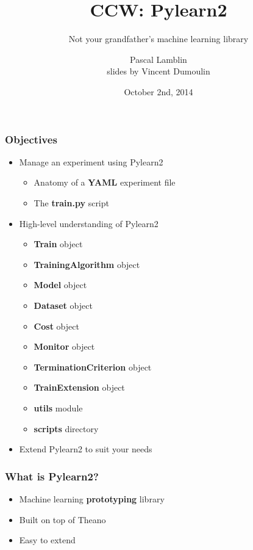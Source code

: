 \documentclass[mathserif, xcolor=dvipsnames]{beamer}
\title{CCW: Pylearn2}
\subtitle{Not your grandfather's machine learning library}
\author{Pascal Lamblin\\
slides by Vincent Dumoulin}
\date{October 2nd, 2014}
\begin{document}
\begin{frame}[plain]
    \titlepage
\end{frame}

\begin{frame}
    \frametitle{Objectives}
    \begin{itemize}\addtolength{\itemsep}{0.5\baselineskip}
        \item{
            {\Large Manage an experiment using Pylearn2}
            \begin{itemize}
                \item{Anatomy of a \textbf{YAML} experiment file}
                \item{The \textbf{train.py} script}
            \end{itemize}
        }
        \item{
            {\Large High-level understanding of Pylearn2}
            \begin{itemize}
                \item{\textbf{Train} object}
                \item{\textbf{TrainingAlgorithm} object}
                \item{\textbf{Model} object}
                \item{\textbf{Dataset} object}
                \item{\textbf{Cost} object}
                \item{\textbf{Monitor} object}
                \item{\textbf{TerminationCriterion} object}
                \item{\textbf{TrainExtension} object}
                \item{\textbf{utils} module}
                \item{\textbf{scripts} directory}
            \end{itemize}
        }
        \item{
            {\Large Extend Pylearn2 to suit your needs}
        }
    \end{itemize}
\end{frame}

\begin{frame}
    \frametitle{What is Pylearn2?}
    \begin{itemize}\addtolength{\itemsep}{2.0\baselineskip}
        \item{\LARGE Machine learning \textbf{prototyping} library}
        \item{\LARGE Built on top of Theano}
        \item{\LARGE Easy to extend}
    \end{itemize}
\end{frame}
\end{document}
